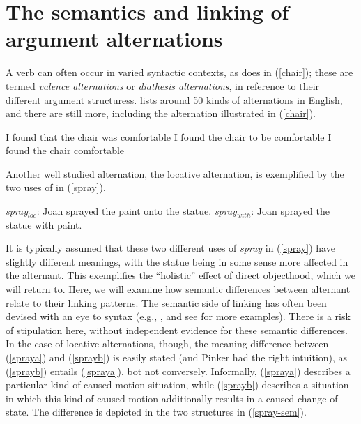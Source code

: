 \documentclass[output=paper]{langsci/langscibook}
\begin{document}
 



\section{The semantics and linking of argument alternations}
\label{alternations}

A verb can often occur in varied syntactic contexts, as  does in (\ref{chair}); these are termed \emph{valence alternations} or \emph{diathesis alternations}, in reference to their different argument structuress.
\citet{Levin1993} lists around 50 kinds of alternations in English, and there are still more, including the alternation illustrated in (\ref{chair}).  

\begin{exe}
	\ex\label{chair}
	\begin{xlist}
	\ex\label{chair-a} I found that the chair was comfortable
	\ex\label{chair-b} I found the chair to be comfortable
	\ex\label{chair-c} I found the chair comfortable	
	\end{xlist}
\end{exe}

Another well studied alternation, the locative alternation, is exemplified by the two uses of  in (\ref{spray}).

\begin{exe}
\ex \label{spray}
\begin{xlist}
\ex \label{spraya} \textit{spray$_{loc}$}: Joan sprayed the paint onto the statue.
\ex \label{sprayb} \textit{spray$_{with}$}: Joan sprayed the statue with paint.
 \end{xlist}
 \end{exe}


It is typically assumed that these two different uses of \textit{spray} in (\ref{spray}) have slightly different meanings, with the statue being in some sense more affected in the  alternant.
This exemplifies the ``holistic'' effect of direct objecthood, which we will return to.
Here, we will examine how semantic differences between alternant relate to their linking patterns.
The semantic side of linking has often been devised with an eye to syntax (e.g., \citet{Pinker1989}, and see \citet{KoenigandDavis2006} for more examples).
There is a risk of stipulation here, without independent evidence for these semantic differences.
In the case of locative alternations, though, the meaning difference between (\ref{spraya}) and (\ref{sprayb}) is easily stated (and Pinker had the right intuition), as (\ref{sprayb}) entails (\ref{spraya}), bot not conversely.
Informally, (\ref{spraya}) describes a particular kind of caused motion situation, while  (\ref{sprayb}) describes a situation in which this kind of caused motion additionally results in a caused change of state.
The difference is depicted in the two structures in (\ref{spray-sem}).
\end{document}

